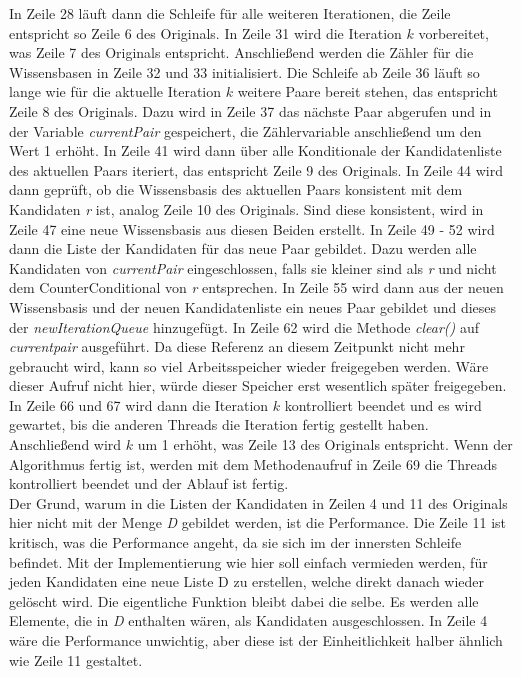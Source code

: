 \documentclass[12pt,a4paper]{article}
\begin{document}
In Zeile 28 läuft dann die Schleife für alle weiteren Iterationen, die Zeile entspricht so Zeile 6 des Originals. In Zeile 31 wird die Iteration $k$ vorbereitet, was Zeile 7 des Originals entspricht. Anschließend werden die Zähler für die Wissensbasen in Zeile 32 und 33 initialisiert. Die Schleife ab Zeile 36 läuft so lange wie für die aktuelle Iteration $k$ weitere Paare bereit stehen, das entspricht Zeile 8 des Originals. Dazu wird in Zeile 37 das nächste Paar abgerufen und in der Variable \textit{currentPair} gespeichert, die Zählervariable anschließend um den Wert 1 erhöht. In Zeile 41 wird dann über alle Konditionale der Kandidatenliste des aktuellen Paars iteriert, das entspricht Zeile 9 des Originals. In Zeile 44 wird dann geprüft, ob die Wissensbasis des aktuellen Paars konsistent mit dem Kandidaten \textit{r} ist, analog Zeile 10 des Originals. Sind diese konsistent, wird in Zeile 47 eine neue Wissensbasis aus diesen Beiden erstellt. In Zeile 49 - 52 wird dann die Liste der Kandidaten für das neue Paar gebildet. Dazu werden alle Kandidaten von \textit{currentPair} eingeschlossen, falls sie kleiner sind als \textit{r} und nicht dem CounterConditional von \textit{r} entsprechen. In Zeile 55 wird dann aus der neuen Wissensbasis und der neuen Kandidatenliste ein neues Paar gebildet und dieses der \textit{newIterationQueue} hinzugefügt. In Zeile 62 wird die Methode \textit{clear()} auf \textit{currentpair} ausgeführt. Da diese Referenz  an diesem Zeitpunkt nicht mehr gebraucht wird, kann so viel Arbeitsspeicher wieder freigegeben werden. Wäre dieser Aufruf nicht hier, würde dieser Speicher erst wesentlich später freigegeben. In Zeile 66 und 67 wird dann die Iteration $k$ kontrolliert beendet und es wird gewartet, bis die anderen Threads die Iteration fertig gestellt haben. Anschließend wird $k$ um 1 erhöht, was Zeile 13 des Originals entspricht. Wenn der Algorithmus fertig ist, werden mit dem Methodenaufruf in Zeile 69 die Threads kontrolliert beendet und der Ablauf ist fertig. \\
Der Grund, warum in die Listen der Kandidaten in Zeilen 4 und 11 des Originals hier nicht mit der Menge \textit{D} gebildet werden, ist die Performance. Die Zeile 11 ist kritisch, was die Performance angeht, da sie sich im der innersten Schleife befindet. Mit der Implementierung wie hier soll einfach vermieden werden, für jeden Kandidaten eine neue Liste D zu erstellen, welche direkt danach wieder gelöscht wird. Die eigentliche Funktion bleibt dabei die selbe. Es werden alle Elemente, die in \textit{D} enthalten wären, als Kandidaten ausgeschlossen. In Zeile 4 wäre die Performance unwichtig, aber diese ist der Einheitlichkeit halber ähnlich wie Zeile 11 gestaltet. \\
\end{document}
